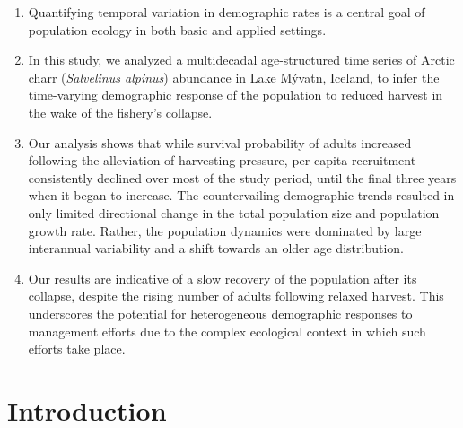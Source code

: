 \documentclass[11pt]{article}
\begin{document}
\begin{enumerate}[label=\arabic*.]
\item
Quantifying temporal variation in demographic rates is a central goal of population ecology
in both basic and applied settings.

\item
In this study, we analyzed a multidecadal age-structured time series 
of Arctic charr (\emph{Salvelinus alpinus}) abundance  in Lake M\'{y}vatn, Iceland, 
to infer the time-varying demographic response of the population 
to reduced harvest in the wake of the fishery's collapse.

\item
Our analysis shows that while survival probability of adults increased following the alleviation
of harvesting pressure, 
per capita recruitment consistently declined over most of the study period,
until the final three years when it began to increase.
The countervailing demographic trends resulted 
in only limited directional change in the total population size and population growth rate.
Rather, the population dynamics were dominated by large interannual variability
and a shift towards an older age distribution.

\item
Our results are indicative of a slow recovery of the population after its collapse,
despite the rising number of adults following relaxed harvest.
This underscores the potential for heterogeneous demographic responses to management efforts
due to the complex ecological context in which such efforts take place.

\end{enumerate}

\bigskip

\clearpage




\section*{Introduction}
\end{document}
